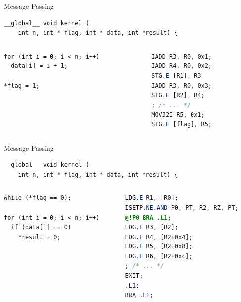 \documentclass[aspectratio=169,compress]{beamer}
\begin{document}
\begin{frame}[fragile]{Message Passing}{}
\centering
\begin{lstlisting}
__global__ void kernel (
    int n, int * flag, int * data, int *result) { 
\end{lstlisting}

\begin{columns}[T]
	\begin{column}{0.45\textwidth}
\begin{lstlisting}[title={Writer}]
for (int i = 0; i < n; i++)
  data[i] = i + 1;

*flag = 1;
\end{lstlisting}
\end{column}

\begin{column}{0.45\textwidth}
\begin{lstlisting}[language={SASS},title={SASS}]
IADD R3, R0, 0x1;
IADD R4, R0, 0x2;
STG.E [R1], R3
IADD R3, R0, 0x3;
STG.E [R2], R4;
; /* ... */
MOV32I R5, 0x1;
STG.E [flag], R5;
\end{lstlisting}
\end{column}
	\end{columns}
\end{frame}

\begin{frame}[fragile]{Message Passing}{}
\centering
\begin{lstlisting}
__global__ void kernel (
    int n, int * flag, int * data, int *result) { 
\end{lstlisting}

\begin{columns}[T]
	\begin{column}{0.45\textwidth}
\begin{lstlisting}[title={Reader}]
while (*flag == 0);

for (int i = 0; i < n; i++)
  if (data[i] == 0)
    *result = 0;
\end{lstlisting}
\end{column}

\begin{column}{0.45\textwidth}
\begin{lstlisting}[language={SASS},title={SASS}]
LDG.E R1, [R0];
ISETP.NE.AND P0, PT, R2, RZ, PT;
@!P0 BRA .L1;
LDG.E R3, [R2];
LDG.E R4, [R2+0x4];
LDG.E R5, [R2+0x8];
LDG.E R6, [R2+0xc];
; /* ... */
EXIT;
.L1:
BRA .L1;
\end{lstlisting}
\end{column}
	\end{columns}
\end{frame}
\end{document}
